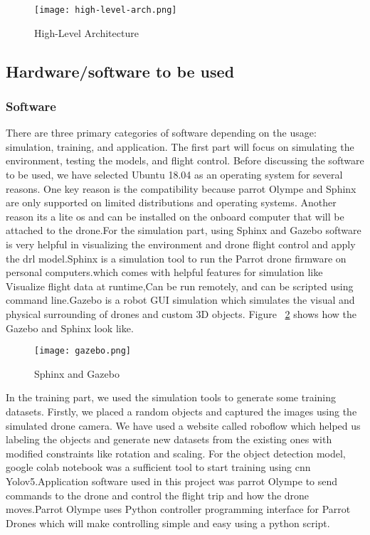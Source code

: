 \documentclass[../main.tex]{subfiles}
\begin{document}
\begin{figure}[H]
	\centering
	\texttt{[image: high-level-arch.png]}
	\caption{High-Level Architecture}\label{fig1:arch-fig}
\end{figure}


\subsection{Hardware/software to be used}

\subsubsection{Software}
There are three primary categories of software depending on the usage: simulation, training, and application. The first part will focus on simulating the environment, testing the models, and flight control. Before discussing the software to be used, we have selected Ubuntu 18.04 as an operating system for several reasons. One key reason is the compatibility because parrot Olympe and Sphinx are only supported on limited distributions and operating systems. Another reason its a lite os and can be installed on the onboard computer that will be attached to the drone.For the simulation part, using Sphinx and Gazebo software is very helpful in visualizing the environment and drone flight control and apply the \gls{drl} model.Sphinx is a simulation tool to run the Parrot drone firmware on personal computers.which comes with helpful features for simulation like Visualize flight data at runtime,Can be run remotely, and can be scripted using command line.Gazebo is a robot GUI simulation which simulates the visual and physical surrounding of drones and custom 3D objects. Figure ~\ref{fig2:gazebo} shows how the Gazebo and Sphinx look like. \begin{figure}[H]
	\centering
	\texttt{[image: gazebo.png]}
	\caption{Sphinx and Gazebo }\label{fig2:gazebo}
\end{figure}
In the training part, we used the simulation tools to generate some training datasets. Firstly, we placed a random objects and captured the images using the simulated drone camera. We have used a website called roboflow which helped us labeling the objects and generate new datasets from the existing ones with modified constraints like rotation and scaling. For the object detection model, google colab notebook was a sufficient tool to start training using \gls{cnn} Yolov5.Application software used in this project was parrot Olympe to send commands to the drone and control the flight trip and how the drone moves.Parrot Olympe uses Python controller programming interface for Parrot Drones which will make controlling simple and easy using a python script.
\end{document}
